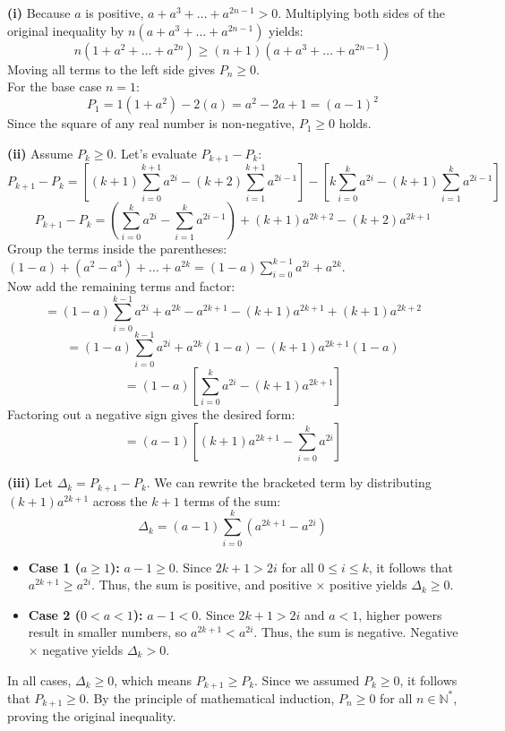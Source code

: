 \begin{solution}[Brief]
\textbf{(i)}
Because $a$ is positive, $a + a^3 + \dots + a^{2n-1} > 0$. Multiplying both sides of the original inequality by $n(a + a^3 + \dots + a^{2n-1})$ yields:
\[ n(1 + a^2 + \dots + a^{2n}) \ge (n+1)(a + a^3 + \dots + a^{2n-1}) \]
Moving all terms to the left side gives $P_n \ge 0$. \\
For the base case $n=1$:
\[ P_1 = 1(1+a^2) - 2(a) = a^2 - 2a + 1 = (a-1)^2 \]
Since the square of any real number is non-negative, $P_1 \ge 0$ holds.

\textbf{(ii)}
Assume $P_k \ge 0$. Let's evaluate $P_{k+1} - P_k$:
\[ P_{k+1} - P_k = \left[ (k+1)\sum_{i=0}^{k+1} a^{2i} - (k+2)\sum_{i=1}^{k+1} a^{2i-1} \right] - \left[ k\sum_{i=0}^k a^{2i} - (k+1)\sum_{i=1}^k a^{2i-1} \right] \]
\[ P_{k+1} - P_k = \left( \sum_{i=0}^k a^{2i} - \sum_{i=1}^k a^{2i-1} \right) + (k+1)a^{2k+2} - (k+2)a^{2k+1} \]
Group the terms inside the parentheses: $(1-a) + (a^2-a^3) + \dots + a^{2k} = (1-a)\sum_{i=0}^{k-1} a^{2i} + a^{2k}$. \\
Now add the remaining terms and factor:
\[ = (1-a)\sum_{i=0}^{k-1} a^{2i} + a^{2k} - a^{2k+1} - (k+1)a^{2k+1} + (k+1)a^{2k+2} \]
\[ = (1-a)\sum_{i=0}^{k-1} a^{2i} + a^{2k}(1-a) - (k+1)a^{2k+1}(1-a) \]
\[ = (1-a) \left[ \sum_{i=0}^k a^{2i} - (k+1)a^{2k+1} \right] \]
Factoring out a negative sign gives the desired form:
\[ = (a-1) \left[ (k+1)a^{2k+1} - \sum_{i=0}^k a^{2i} \right] \]

\textbf{(iii)}
Let $\Delta_k = P_{k+1} - P_k$. We can rewrite the bracketed term by distributing $(k+1)a^{2k+1}$ across the $k+1$ terms of the sum:
\[ \Delta_k = (a-1) \sum_{i=0}^k (a^{2k+1} - a^{2i}) \]
\begin{itemize}
    \item \textbf{Case 1 ($a \ge 1$):} $a-1 \ge 0$. Since $2k+1 > 2i$ for all $0 \le i \le k$, it follows that $a^{2k+1} \ge a^{2i}$. Thus, the sum is positive, and positive $\times$ positive yields $\Delta_k \ge 0$.
    \item \textbf{Case 2 ($0 < a < 1$):} $a-1 < 0$. Since $2k+1 > 2i$ and $a < 1$, higher powers result in smaller numbers, so $a^{2k+1} < a^{2i}$. Thus, the sum is negative. Negative $\times$ negative yields $\Delta_k > 0$.
\end{itemize}
In all cases, $\Delta_k \ge 0$, which means $P_{k+1} \ge P_k$. Since we assumed $P_k \ge 0$, it follows that $P_{k+1} \ge 0$. By the principle of mathematical induction, $P_n \ge 0$ for all $n \in \mathbb{N}^*$, proving the original inequality.
\end{solution}


